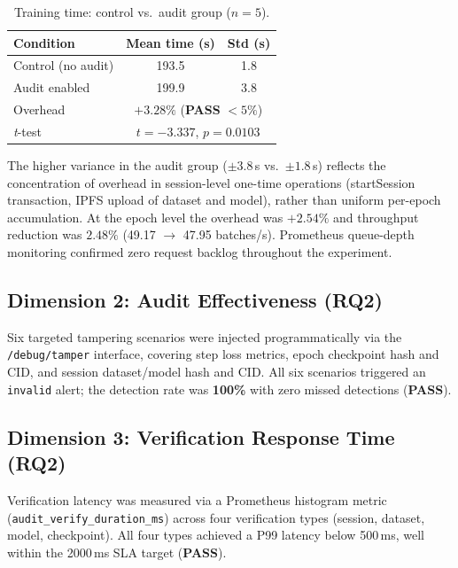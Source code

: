 \documentclass[10pt,twocolumn]{article}
\begin{document}
\begin{table}[ht]
  \centering
  \caption{Training time: control vs.\ audit group ($n=5$).}
  \label{tab:perf}
  \small
  \begin{tabular}{lcc}
    \toprule
    Condition & Mean time (s) & Std (s) \\
    \midrule
    Control (no audit) & 193.5 & 1.8 \\
    Audit enabled       & 199.9 & 3.8 \\
    \midrule
    Overhead            & \multicolumn{2}{c}{$+3.28\%$ \quad (\textbf{PASS} $< 5\%$)} \\
    \textit{t}-test     & \multicolumn{2}{c}{$t = -3.337$, $p = 0.0103$} \\
    \bottomrule
  \end{tabular}
\end{table}

The higher variance in the audit group ($\pm3.8$\,s vs.\ $\pm1.8$\,s) reflects the
concentration of overhead in session-level one-time operations (startSession transaction,
IPFS upload of dataset and model), rather than uniform per-epoch accumulation. At the
epoch level the overhead was $+2.54\%$ and throughput reduction was $2.48\%$
(49.17 $\to$ 47.95 batches/s). Prometheus queue-depth monitoring confirmed zero request
backlog throughout the experiment.

\subsection{Dimension 2: Audit Effectiveness (RQ2)}

Six targeted tampering scenarios were injected programmatically via the
\texttt{/debug/tamper} interface, covering step loss metrics, epoch checkpoint hash and
CID, and session dataset/model hash and CID. All six scenarios triggered an
\texttt{invalid} alert; the detection rate was \textbf{100\%} with zero missed detections
(\textbf{PASS}).

\subsection{Dimension 3: Verification Response Time (RQ2)}

Verification latency was measured via a Prometheus histogram metric
(\texttt{audit\_verify\_duration\_ms}) across four verification types (session, dataset,
model, checkpoint). All four types achieved a P99 latency below 500\,ms, well within
the 2000\,ms SLA target (\textbf{PASS}).
\end{document}
